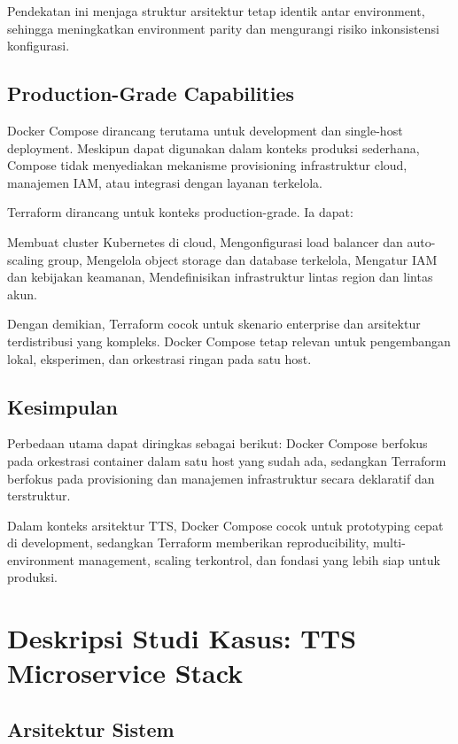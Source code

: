 Pendekatan ini menjaga struktur arsitektur tetap identik antar environment, sehingga meningkatkan environment parity dan mengurangi risiko inkonsistensi konfigurasi.




\subsection{Production-Grade Capabilities}

Docker Compose dirancang terutama untuk development dan single-host deployment. Meskipun dapat digunakan dalam konteks produksi sederhana, Compose tidak menyediakan mekanisme provisioning infrastruktur cloud, manajemen IAM, atau integrasi dengan layanan terkelola.

Terraform dirancang untuk konteks production-grade. Ia dapat:

Membuat cluster Kubernetes di cloud,  
Mengonfigurasi load balancer dan auto-scaling group,  
Mengelola object storage dan database terkelola,  
Mengatur IAM dan kebijakan keamanan,  
Mendefinisikan infrastruktur lintas region dan lintas akun.  

Dengan demikian, Terraform cocok untuk skenario enterprise dan arsitektur terdistribusi yang kompleks. Docker Compose tetap relevan untuk pengembangan lokal, eksperimen, dan orkestrasi ringan pada satu host.

\subsection*{Kesimpulan}

Perbedaan utama dapat diringkas sebagai berikut: Docker Compose berfokus pada orkestrasi container dalam satu host yang sudah ada, sedangkan Terraform berfokus pada provisioning dan manajemen infrastruktur secara deklaratif dan terstruktur.

Dalam konteks arsitektur TTS, Docker Compose cocok untuk prototyping cepat di development, sedangkan Terraform memberikan reproducibility, multi-environment management, scaling terkontrol, dan fondasi yang lebih siap untuk produksi.


\section{Deskripsi Studi Kasus: TTS Microservice Stack}

\subsection{Arsitektur Sistem}

